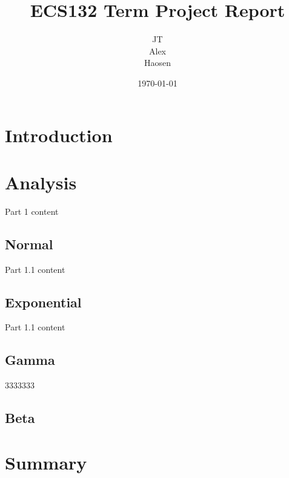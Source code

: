 \documentclass[12pt, a4paper, oneside]{report}
\title{ECS132 Term Project Report}
\author{JT\\Alex\\Haosen}
\date{\today}
\begin{document}
\maketitle
\tableofcontents
\newpage

\chapter{Introduction}

\newpage

\chapter{Analysis}
Part 1 content
\newpage

\section{Normal}
Part 1.1 content
\newpage

\section{Exponential}
Part 1.1 content
\newpage

\section{Gamma}
3333333
\newpage


\section{Beta}
\newpage


\chapter{Summary}
\newpage
\end{document}
